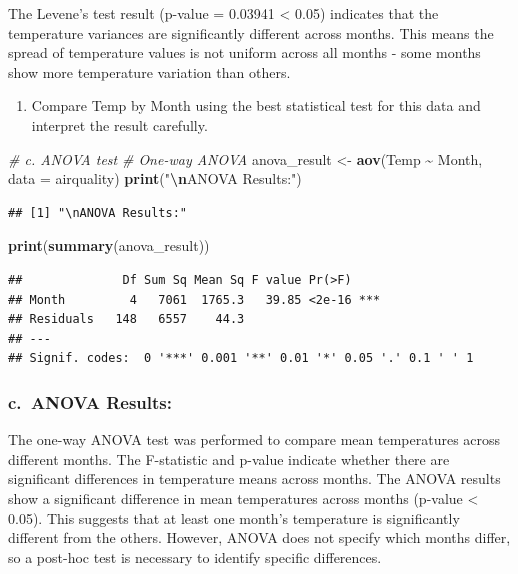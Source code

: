 \documentclass[
]{article}
\newenvironment{Shaded}{\begin{snugshade}}{\end{snugshade}}
\newcommand{\AttributeTok}[1]{\textcolor[rgb]{0.13,0.29,0.53}{#1}}
\newcommand{\CommentTok}[1]{\textcolor[rgb]{0.56,0.35,0.01}{\textit{#1}}}
\newcommand{\FunctionTok}[1]{\textcolor[rgb]{0.13,0.29,0.53}{\textbf{#1}}}
\newcommand{\NormalTok}[1]{#1}
\newcommand{\OtherTok}[1]{\textcolor[rgb]{0.56,0.35,0.01}{#1}}
\newcommand{\SpecialCharTok}[1]{\textcolor[rgb]{0.81,0.36,0.00}{\textbf{#1}}}
\newcommand{\StringTok}[1]{\textcolor[rgb]{0.31,0.60,0.02}{#1}}
\providecommand{\tightlist}{%
  \setlength{\itemsep}{0pt}\setlength{\parskip}{0pt}}
\begin{document}
The Levene's test result (p-value = 0.03941 \textless{} 0.05) indicates
that the temperature variances are significantly different across
months. This means the spread of temperature values is not uniform
across all months - some months show more temperature variation than
others.

\begin{enumerate}
\def\labelenumi{\alph{enumi}.}
\setcounter{enumi}{2}
\tightlist
\item
  Compare Temp by Month using the best statistical test for this data
  and interpret the result carefully.
\end{enumerate}

\begin{Shaded}
\begin{Highlighting}[]
\CommentTok{\# c. ANOVA test}
\CommentTok{\# One{-}way ANOVA}
\NormalTok{anova\_result }\OtherTok{\textless{}{-}} \FunctionTok{aov}\NormalTok{(Temp }\SpecialCharTok{\textasciitilde{}}\NormalTok{ Month, }\AttributeTok{data =}\NormalTok{ airquality)}
\FunctionTok{print}\NormalTok{(}\StringTok{"}\SpecialCharTok{\textbackslash{}n}\StringTok{ANOVA Results:"}\NormalTok{)}
\end{Highlighting}
\end{Shaded}

\begin{verbatim}
## [1] "\nANOVA Results:"
\end{verbatim}

\begin{Shaded}
\begin{Highlighting}[]
\FunctionTok{print}\NormalTok{(}\FunctionTok{summary}\NormalTok{(anova\_result))}
\end{Highlighting}
\end{Shaded}

\begin{verbatim}
##              Df Sum Sq Mean Sq F value Pr(>F)    
## Month         4   7061  1765.3   39.85 <2e-16 ***
## Residuals   148   6557    44.3                   
## ---
## Signif. codes:  0 '***' 0.001 '**' 0.01 '*' 0.05 '.' 0.1 ' ' 1
\end{verbatim}

\subsubsection{c.~ANOVA Results:}\label{c.-anova-results}

The one-way ANOVA test was performed to compare mean temperatures across
different months. The F-statistic and p-value indicate whether there are
significant differences in temperature means across months. The ANOVA
results show a significant difference in mean temperatures across months
(p-value \textless{} 0.05). This suggests that at least one month's
temperature is significantly different from the others. However, ANOVA
does not specify which months differ, so a post-hoc test is necessary to
identify specific differences.
\end{document}
